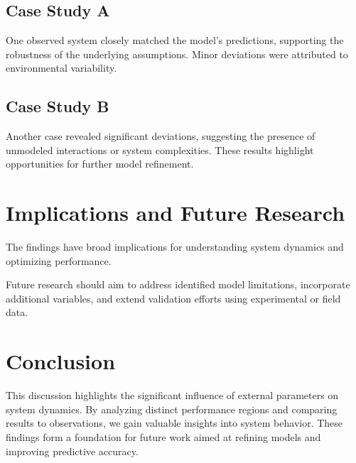 \subsection*{Case Study A}
One observed system closely matched the model's predictions, supporting the robustness of the underlying assumptions. Minor deviations were attributed to environmental variability.

\subsection*{Case Study B}
Another case revealed significant deviations, suggesting the presence of unmodeled interactions or system complexities. These results highlight opportunities for further model refinement.

\section{Implications and Future Research}
The findings have broad implications for understanding system dynamics and optimizing performance.

Future research should aim to address identified model limitations, incorporate additional variables, and extend validation efforts using experimental or field data.

\section{Conclusion}
This discussion highlights the significant influence of external parameters on system dynamics. By analyzing distinct performance regions and comparing results to observations, we gain valuable insights into system behavior. These findings form a foundation for future work aimed at refining models and improving predictive accuracy.
